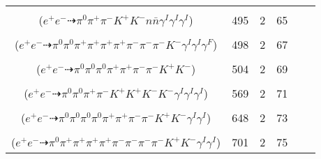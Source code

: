 \documentclass[landscape]{article}
\newcounter{rownumbers}
\newcommand\rn{\stepcounter{rownumbers}\arabic{rownumbers}}
\newcommand{\EOL}{\\} %
\newcommand{\topoTags}[1]{#1} %
\begin{document}
\begin{longtable}{clcccc}
\rn & \makecell[l]{ $ 
e^{+} e^{-} \rightarrow \pi^{0} \pi^{-} \bar{K}^{*} K^{+} n \bar{n} \gamma^{I} \gamma^{I} \gamma^{I} ,
\bar{K}^{*} \rightarrow \pi^{+} K^{-} 
$ \\ ($
e^{+} e^{-} \dashrightarrow \pi^{0} \pi^{+} \pi^{-} K^{+} K^{-} n \bar{n} \gamma^{I} \gamma^{I} \gamma^{I} 
$) } & \topoTags{495 & }2 & 65 \EOL

\rn & \makecell[l]{ $ 
e^{+} e^{-} \rightarrow \pi^{0} \pi^{0} \rho^{0} \pi^{+} \pi^{-} K^{0} \bar{K}^{*} \gamma^{I} \gamma^{I} ,
\rho^{0} \rightarrow \pi^{+} \pi^{-} ,
K^{0} \rightarrow K_{S}^{0} ,
\bar{K}^{*} \rightarrow \pi^{+} K^{-} ,
K_{S}^{0} \rightarrow \pi^{+} \pi^{-} \gamma^{F} 
$ \\ ($
e^{+} e^{-} \dashrightarrow \pi^{0} \pi^{0} \pi^{+} \pi^{+} \pi^{+} \pi^{+} \pi^{-} \pi^{-} \pi^{-} K^{-} \gamma^{I} \gamma^{I} \gamma^{F} 
$) } & \topoTags{498 & }2 & 67 \EOL

\rn & \makecell[l]{ $ 
e^{+} e^{-} \rightarrow \pi^{0} \pi^{0} \rho^{0} \pi^{-} \rho^{+} K^{+} K^{-} ,
\rho^{0} \rightarrow \pi^{+} \pi^{-} ,
\rho^{+} \rightarrow \pi^{0} \pi^{+} 
$ \\ ($
e^{+} e^{-} \dashrightarrow \pi^{0} \pi^{0} \pi^{0} \pi^{+} \pi^{+} \pi^{-} \pi^{-} K^{+} K^{-} 
$) } & \topoTags{504 & }2 & 69 \EOL

\rn & \makecell[l]{ $ 
e^{+} e^{-} \rightarrow \pi^{0} \pi^{0} \pi^{+} K^{*} K^{-} \phi \gamma^{I} \gamma^{I} \gamma^{I} ,
K^{*} \rightarrow \pi^{-} K^{+} ,
\phi \rightarrow K^{+} K^{-} 
$ \\ ($
e^{+} e^{-} \dashrightarrow \pi^{0} \pi^{0} \pi^{+} \pi^{-} K^{+} K^{+} K^{-} K^{-} \gamma^{I} \gamma^{I} \gamma^{I} 
$) } & \topoTags{569 & }2 & 71 \EOL

\rn & \makecell[l]{ $ 
e^{+} e^{-} \rightarrow \pi^{0} \pi^{0} \pi^{0} \pi^{+} \eta K^{*} K^{-} \gamma^{I} \gamma^{I} ,
\eta \rightarrow \pi^{0} \pi^{+} \pi^{-} ,
K^{*} \rightarrow \pi^{-} K^{+} 
$ \\ ($
e^{+} e^{-} \dashrightarrow \pi^{0} \pi^{0} \pi^{0} \pi^{0} \pi^{+} \pi^{+} \pi^{-} \pi^{-} K^{+} K^{-} \gamma^{I} \gamma^{I} 
$) } & \topoTags{648 & }2 & 73 \EOL

\rn & \makecell[l]{ $ 
e^{+} e^{-} \rightarrow \rho^{0} \rho^{0} \pi^{+} \pi^{-} \eta K^{+} K^{-} \gamma^{I} \gamma^{I} ,
\rho^{0} \rightarrow \pi^{+} \pi^{-} ,
\rho^{0} \rightarrow \pi^{+} \pi^{-} ,
\eta \rightarrow \pi^{0} \pi^{+} \pi^{-} 
$ \\ ($
e^{+} e^{-} \dashrightarrow \pi^{0} \pi^{+} \pi^{+} \pi^{+} \pi^{+} \pi^{-} \pi^{-} \pi^{-} \pi^{-} K^{+} K^{-} \gamma^{I} \gamma^{I} 
$) } & \topoTags{701 & }2 & 75 \EOL


\end{longtable}
\end{document}
